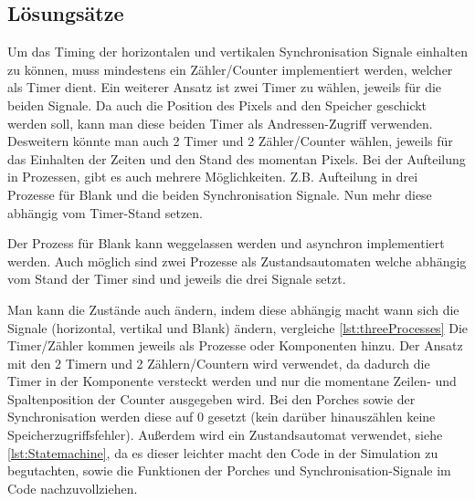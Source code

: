 \documentclass[12pt,a4paper,bibliography=totoc,listof=totoc]{scrartcl}
\begin{document}
\subsection{Lösungsätze}
Um das Timing der horizontalen und vertikalen Synchronisation Signale einhalten zu können, muss mindestens ein Zähler/Counter implementiert werden, welcher als Timer dient.
Ein weiterer Ansatz ist zwei Timer zu wählen, jeweils für die beiden Signale. Da auch die Position des Pixels and den Speicher geschickt werden soll, kann man diese 
beiden Timer als Andressen-Zugriff verwenden. Desweitern könnte man auch 2 Timer und 2 Zähler/Counter wählen, jeweils für das Einhalten der Zeiten und den Stand des momentan 
Pixels. 
Bei der Aufteilung in Prozessen, gibt es auch mehrere Möglichkeiten. Z.B. Aufteilung in drei Prozesse für Blank und die beiden Synchronisation Signale. Nun mehr diese 
abhängig vom Timer-Stand setzen. 
\vspace{1em}

Der Prozess für Blank kann weggelassen werden und asynchron implementiert werden.
Auch möglich sind zwei Prozesse als Zustandsautomaten welche abhängig vom Stand der Timer sind und jeweils die drei Signale setzt.
\vspace{1em}

Man kann die Zustände auch ändern, indem diese abhängig macht wann sich die Signale (horizontal, vertikal und Blank) ändern, vergleiche \ref{lst:threeProcesses}
Die Timer/Zähler kommen jeweils als Prozesse oder Komponenten hinzu.
\newline
Der Ansatz mit den 2 Timern und 2 Zählern/Countern wird verwendet, da dadurch die Timer in der Komponente versteckt werden und nur die momentane Zeilen- und 
Spaltenposition der Counter ausgegeben wird. Bei den Porches sowie der Synchronisation werden diese auf 0 gesetzt (kein darüber hinauszählen keine
Speicherzugriffsfehler). Außerdem wird ein Zustandsautomat verwendet, siehe \ref{lst:Statemachine}, da es dieser leichter macht den Code in der Simulation
zu begutachten, sowie die Funktionen der Porches und Synchronisation-Signale im Code nachzuvollziehen.
\end{document}
